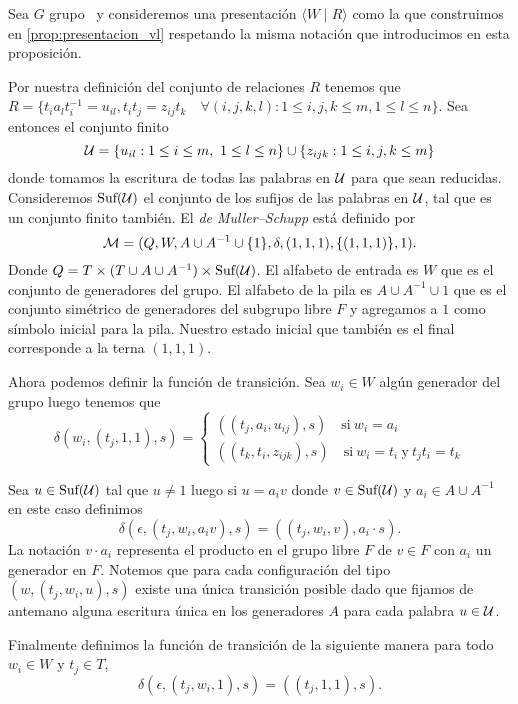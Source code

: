 \documentclass[tesis.tex]{subfiles}
\begin{document}
	Sea $G$ grupo \vl  \ y consideremos una presentación $\langle W  \mid  R \rangle$ como la que construimos en \ref{prop:presentacion_vl} respetando la misma notación que introducimos en esta proposición.
	
	Por nuestra definición del conjunto de relaciones $R$ tenemos que $R = \{t_ia_{l}t_i^{-1} = u_{il},  t_it_j = z_{ij}t_k \quad \forall (i,j,k,l) :   1 \le i,j,k \le m, 1 \le l  \le n \}$. 
	Sea entonces el conjunto finito 
	\[
	{\cal U} =  \{u_{il} : 1 \le i \le m, \ 1 \le l \le n \}  \cup  \{z_{ijk} : 1 \le i,j,k \le m\} 
	\]
	donde tomamos la escritura de todas las palabras en $\cal{U}$ para que sean reducidas.
	Consideremos 
	$\text{Suf}({\cal U})$
	el conjunto de los sufijos de las palabras en $\cal U$, tal que es un conjunto finito también.
	El \emph{\APD de Muller--Schupp } está definido por 
	\[
	{\cal M }= (Q, W , A \cup A^{-1} \cup \{ 1 \}, \delta, (1,1,1), \{(1,1,1)\}, 1).
	\]
	Donde $Q = T \times (T \cup A \cup A^{-1}) \times \text{Suf}(\cal U)$.
	El alfabeto de entrada es $W$ que es el conjunto de generadores del grupo.
	El alfabeto de la pila es $A \cup A^{-1} \cup 1$ que es el conjunto simétrico de generadores del subgrupo libre $F$ y agregamos a $1$ como símbolo inicial para la pila.
	Nuestro estado inicial que también es el final corresponde a la terna $(1,1,1)$.

	Ahora podemos definir la función de transición. 
	Sea $w_i \in W$ algún generador del grupo luego tenemos que
	\[
	\delta(w_i,(t_j,1,1), s) =
	\begin{cases}
		((t_j,a_i,u_{ij}), s) \quad \text{si} \ w_{i}=a_{i} \\
		((t_k,t_i,z_{ijk}), s) \quad \text{si} \ w_{i}=t_{i} \ \text{y} \ t_{j}t_{i} = t_{k}
	\end{cases}\]


	Sea $u \in \text{Suf}({\cal U})$ tal que $u \neq 1$ luego si $u = a_{i}v $ donde $v \in \text{Suf}(\cal U)$ y $a_{i} \in A \cup A^{-1}$ 
	en este caso definimos 
	\begin{equation*}
		\delta(\epsilon,(t_j,w_i,a_{i}v), s) = ((t_j,w_i,v), a_{i} \cdot s).
	\end{equation*}
	La notación $v \cdot a_{i}$ representa el producto en el grupo libre $F$ de $v \in F$ con $a_{i}$ un generador en $F$.
	Notemos que para cada configuración del tipo $(w,(t_{j}, w_{i}, u),s)$ existe una única transición posible dado que fijamos de antemano alguna escritura única en los generadores $A$ para cada palabra $u \in \cal U$.
	
	Finalmente definimos la función de transición de la siguiente manera para todo $w_{i} \in W$ y $t_{j} \in T$,
	\[
		\delta(\epsilon, (t_{j},w_{i},1), s) = ((t_{j},1,1),s).
	\]
\end{document}
